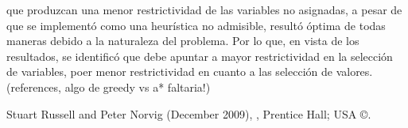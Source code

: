 \documentclass[%
    final,
    reprint,
    notitlepage,
    narroweqnarray,
    inline,
    twoside,
    invited
    ]{ieee}
\begin{document}
que produzcan una menor restrictividad de las variables no asignadas, a pesar de que se implementó como una heurística no admisible, resultó 
óptima de todas maneras debido a la naturaleza del problema. Por lo que, en vista de los resultados, se identificó que debe apuntar a mayor restrictividad 
en la selección de variables, poer menor restrictividad en cuanto a las selección de valores.
(references, algo de greedy vs a* faltaria!)
%
%
%
%
%


\begin{thebibliography}{1}

Stuart Russell and Peter Norvig (December 2009),
,
\newblock Prentice Hall; USA \copyright.







\end{thebibliography}
\end{document}
